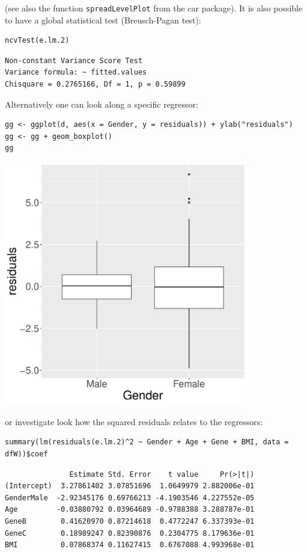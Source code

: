 \documentclass[12pt]{article}
\begin{document}
(see also the function \texttt{spreadLevelPlot} from the car package). It is
also possible to have a global statistical test (Breusch-Pagan test):
\lstset{language=r,label= ,caption= ,captionpos=b,numbers=none}
\begin{lstlisting}
ncvTest(e.lm.2)
\end{lstlisting}

\begin{verbatim}
Non-constant Variance Score Test 
Variance formula: ~ fitted.values 
Chisquare = 0.2765166, Df = 1, p = 0.59899
\end{verbatim}

Alternatively one can look along a specific regressor:
\lstset{language=r,label= ,caption= ,captionpos=b,numbers=none}
\begin{lstlisting}
gg <- ggplot(d, aes(x = Gender, y = residuals)) + ylab("residuals")
gg <- gg + geom_boxplot()
gg
\end{lstlisting}

\begin{center}
\includegraphics[width=0.8\textwidth]{./figures/A2-boxplot.pdf}
\end{center}

or investigate look how the squared residuals relates to the
regressors:
\lstset{language=r,label= ,caption= ,captionpos=b,numbers=none}
\begin{lstlisting}
summary(lm(residuals(e.lm.2)^2 ~ Gender + Age + Gene + BMI, data = dfW))$coef
\end{lstlisting}

\begin{verbatim}
               Estimate Std. Error    t value     Pr(>|t|)
(Intercept)  3.27861402 3.07851696  1.0649979 2.882006e-01
GenderMale  -2.92345176 0.69766213 -4.1903546 4.227552e-05
Age         -0.03880792 0.03964689 -0.9788388 3.288787e-01
GeneB        0.41620970 0.87214618  0.4772247 6.337393e-01
GeneC        0.18989247 0.82390876  0.2304775 8.179636e-01
BMI          0.07868374 0.11627415  0.6767088 4.993968e-01
\end{verbatim}
\end{document}
